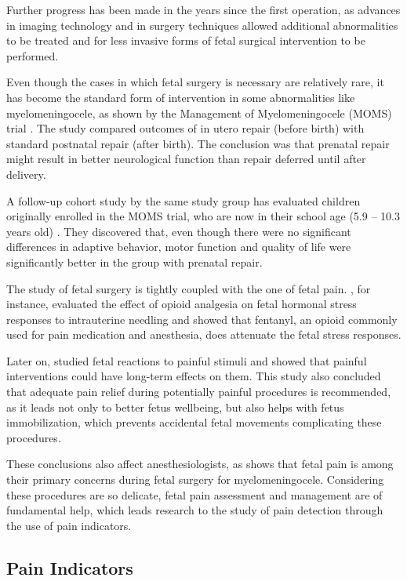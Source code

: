 Further progress has been made in the years since the first operation, as advances in imaging technology and in surgery techniques allowed additional abnormalities to be treated and for less invasive forms of fetal surgical intervention to be performed.

Even though the cases in which fetal surgery is necessary are relatively rare, it has become the standard form of intervention in some abnormalities like myelomeningocele, as shown by the Management of Myelomeningocele (MOMS) trial \citep{Adzick2011}. The study compared outcomes of in utero repair (before birth) with standard postnatal repair (after birth). The conclusion was that prenatal repair might result in better neurological function than repair deferred until after delivery.

A follow-up cohort study by the same study group has evaluated children originally enrolled in the MOMS trial, who are now in their school age (5.9 – 10.3 years old) \citep{Houtrow2020}. They discovered that, even though there were no significant differences in adaptive behavior, motor function and quality of life were significantly better in the group with prenatal repair.

The study of fetal surgery is tightly coupled with the one of fetal pain. \cite{Fisk2001}, for instance, evaluated the effect of opioid analgesia on fetal hormonal stress responses to intrauterine needling and showed that fentanyl, an opioid commonly used for pain medication and anesthesia, does attenuate the fetal stress responses.

Later on, \cite{vandeVelde2012} studied fetal reactions to painful stimuli and showed that painful interventions could have long-term effects on them. This study also concluded that adequate pain relief during potentially painful procedures is recommended, as it leads not only to better fetus wellbeing, but also helps with fetus immobilization, which prevents accidental fetal movements complicating these procedures. 

These conclusions also affect anesthesiologists, as \cite{Devoto2017} shows that fetal pain is among their primary concerns during fetal surgery for myelomeningocele. Considering these procedures are so delicate, fetal pain assessment and management are of fundamental help, which leads research to the study of pain detection through the use of pain indicators.

\subsection{Pain Indicators}

